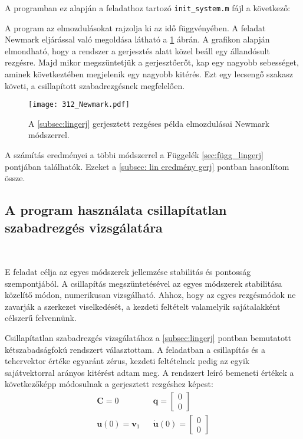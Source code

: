 A programban ez alapján a  feladathoz tartozó \verb|init_system.m| fájl a következő: 


A program az elmozdulásokat rajzolja ki az idő függvényében. A feladat Newmark eljárással való megoldása látható a \ref{fig:lingerjeredm_newmark} ábrán. A grafikon alapján elmondható, hogy a rendszer a gerjesztés alatt közel beáll egy állandósult rezgésre. Majd mikor megszüntetjük a gerjesztőerőt, kap egy nagyobb sebességet, aminek következtében megjelenik egy nagyobb kitérés. Ezt egy lecsengő szakasz követi, a csillapított szabadrezgésnek megfelelően. 
\begin{figure}[h!bt]
\centering
\texttt{[image: 312\_Newmark.pdf]}
\caption{A \ref{subsec:lingerj} gerjesztett rezgéses példa elmozdulásai Newmark módszerrel.}
\label{fig:lingerjeredm_newmark}
\end{figure}

A számítás eredményei a többi módszerrel  a Függelék \ref{sec:függ_lingerj} pontjában találhatók. Ezeket a \ref{subsec: lin eredmény gerj} pontban hasonlítom össze.


\subsection{A program használata csillapítatlan szabadrezgés vizsgálatára}\label{subsec:szabrezg}

{\ }


E feladat célja az egyes módszerek jellemzése stabilitás és pontosság szempontjából. A csillapítás megszüntetésével az egyes módszerek stabilitása közelítő módon, numerikusan vizsgálható. Ahhoz, hogy az egyes rezgésmódok ne zavarják a szerkezet viselkedését, a  kezdeti feltételt valamelyik sajátalakként célszerű felvennünk.

Csillapítatlan szabadrezgés vizsgálatához a \ref{subsec:lingerj} pontban bemutatott kétszabadságfokú rendszert választottam. A feladatban a csillapítás és a tehervektor értéke egyaránt zérus, kezdeti feltételnek pedig az egyik sajátvektorral arányos kitérést adtam meg. A rendszert leíró bemeneti értékek a következőképp módosulnak a  gerjesztett rezgéshez képest:
  \begin{align*}
    & \mathbf{C}  = 0  & & \mathbf{q} = \left[\begin{array}{c} 0 \\ 0 \end{array} \right]  & \\
  & \mathbf{u}(0)  = \mathbf{v}_1  & & \mathbf{\dot{u}}(0) = \left[\begin{array}{c} 0 \\ 0 \end{array} \right]  & 
  \end{align*}
  
